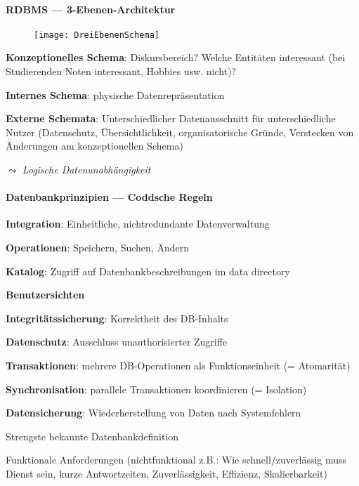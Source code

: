 \paragraph{RDBMS --- 3-Ebenen-Architektur}
\begin{figure}[H]\centering\label{DreiEbenenSchema}\texttt{[image: DreiEbenenSchema]}\end{figure}
\begin{items}
  \item \textbf{Konzeptionelles Schema}: Diskursbereich? Welche Entitäten interessant (bei Studierenden Noten interessant, Hobbies usw. nicht)?
  \item \textbf{Internes Schema}: physische Datenrepräsentation
  \item \textbf{Externe Schemata}: Unterschiedlicher Datenausschnitt für unterschiedliche Nutzer (Datenschutz, Übersichtlichkeit, organisatorische Gründe, Verstecken von Änderungen am konzeptionellen Schema)
  \item \( \leadsto \) \emph{Logische Datenunabhängigkeit}
\end{items}



\paragraph{Datenbankprinzipien --- Coddsche Regeln}
\begin{items}
  \item \textbf{Integration}: Einheitliche, nichtredundante Datenverwaltung
  \item \textbf{Operationen}: Speichern, Suchen, Ändern
  \item \textbf{Katalog}: Zugriff auf Datenbankbeschreibungen im data directory
  \item \textbf{Benutzersichten}
  \item \textbf{Integritätssicherung}: Korrektheit des DB-Inhalts
  \item \textbf{Datenschutz}: Ausschluss unauthorisierter Zugriffe
  \item \textbf{Transaktionen}: mehrere DB-Operationen als Funktionseinheit (= Atomarität)
  \item \textbf{Synchronisation}: parallele Transaktionen koordinieren (= Isolation)
  \item \textbf{Datensicherung}: Wiederherstellung von Daten nach Systemfehlern
  \item Strengste bekannte Datenbankdefinition
  \item Funktionale Anforderungen (nichtfunktional z.B.: Wie schnell/zuverlässig muss Dienst sein, kurze Antwortzeiten, Zuverlässigkeit, Effizienz, Skalierbarkeit)
\end{items}

